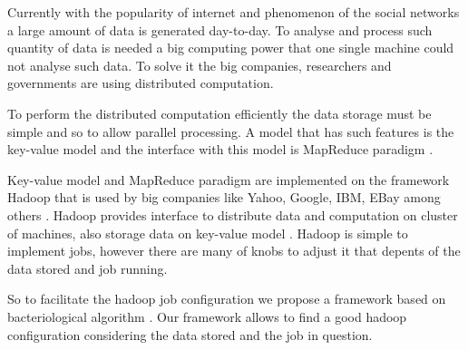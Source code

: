 Currently with the popularity of internet and phenomenon of the social
networks a large amount of data is generated day-to-day. To analyse and
process such quantity of data is needed a big computing power that one
single machine could not analyse such data. To solve it the big companies,
researchers and governments are using distributed computation.

To perform the distributed computation efficiently the data storage must
be simple and so to allow parallel processing. A model that has such features
is the key-value model and the interface with this model is MapReduce
paradigm \cite{Dean:2004}.

Key-value model and MapReduce paradigm are implemented on the framework
Hadoop that is used by big companies like Yahoo, Google, IBM, EBay
among others \cite{hadoop_use}. Hadoop provides interface to distribute data and
computation on cluster of machines, also storage data on key-value
model \cite{hadoop}. Hadoop is simple to implement jobs, however there are many of
knobs to adjust it that depents of the data stored and job running.

So to facilitate the hadoop job configuration we propose a framework based on
bacteriological algorithm \cite{baudry}. Our framework allows to find a good
hadoop configuration considering the data stored and the job in question.
